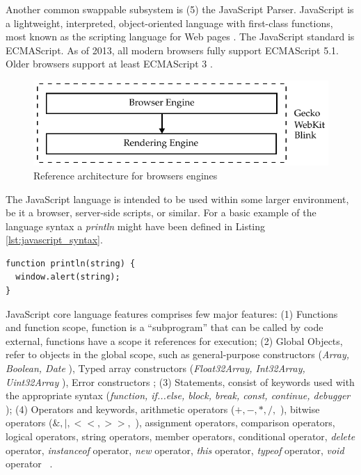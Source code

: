 Another common swappable subsystem is (5) the JavaScript Parser. JavaScript is a lightweight, interpreted, object-oriented language with first-class functions, most known as the scripting language for Web pages \cite{Gecko2013}. The JavaScript standard is ECMAScript. As of 2013, all modern browsers fully support ECMAScript 5.1. Older browsers support at least ECMAScript 3 \cite{Gecko2013} \cite{International2009}.

\begin{figure}[!htb]
  \centering
  \includegraphics{chapters/basic_concepts/web_architecture_engines.pdf}
  \caption{Reference architecture for browsers engines}
  \label{figure:web_architecture_engines}
\end{figure}

The JavaScript language is intended to be used within some larger environment, be it a browser, server-side scripts, or similar. For a basic example of the language syntax a \textit{println} might have been defined in Listing \ref{lst:javascript_syntax}.

\begin{lstlisting}[label={lst:javascript_syntax},caption=Basic example of JavaScript syntax]
function println(string) {
  window.alert(string);
}
\end{lstlisting}

JavaScript core language features comprises few major features: (1) Functions and function scope, function is a ``subprogram'' that can be called by code external, functions have a scope it references for execution; (2) Global Objects, refer to objects in the global scope, such as general-purpose constructors (\textit{Array, Boolean, Date} \etc), Typed array constructors (\textit{Float32Array, Int32Array, Uint32Array} \etc), Error constructors \etc; (3) Statements, consist of keywords used with the appropriate syntax (\textit{function, if...else, block, break, const, continue, debugger \etc}); (4) Operators and keywords, arithmetic operators ($+, -, *, /,$ \etc), bitwise operators ($\&, |, <<, >>,$ \etc), assignment operators, comparison operators, logical operators, string operators, member operators, conditional operator, \textit{delete} operator, \textit{instanceof} operator, \textit{new} operator, \textit{this} operator, \textit{typeof} operator, \textit{void} operator \etc\ \cite{MDN2013}.

